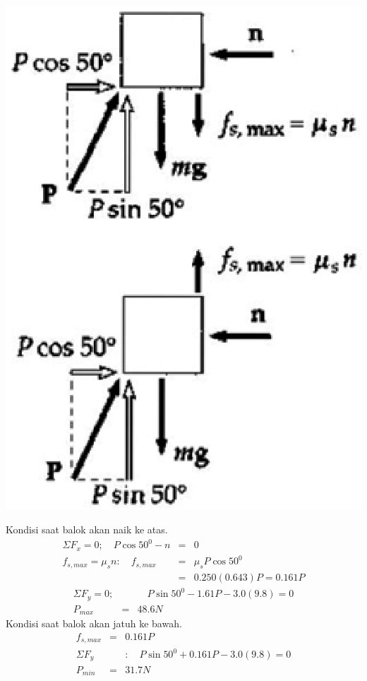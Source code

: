\begin{solution}
\begin{center}
\includegraphics [scale=0.4]{./latex/eps/1_5_14_image_2.eps}
\end{center}

Kondisi saat balok akan naik ke atas. \\
\begin{eqnarray*}
\Sigma F_{x}=0 ;\quad P\cos 50^{0}-n&=&0 \\
f_{s,max}=\mu_{s}n: \quad f_{s,max}&=&\mu_{s} P \cos 50^{0} \\
&=& 0.250(0.643)P=0.161P
\end{eqnarray*}
\begin{eqnarray*}
\Sigma F_{y}=0;& &\quad P\sin 50^{0}-1.61P-3.0(9.8)=0 \\
P_{max}&=&48.6 N
\end{eqnarray*}
Kondisi saat balok akan jatuh ke bawah. \\
\begin{eqnarray*}
f_{s,max}&=&0.161P  \\
\Sigma F_{y}& &:\quad P\sin50^{0}+0.161P-3.0(9.8)=0 \\
P_{min}&=&31.7 N
\end{eqnarray*} 
\end{solution}
